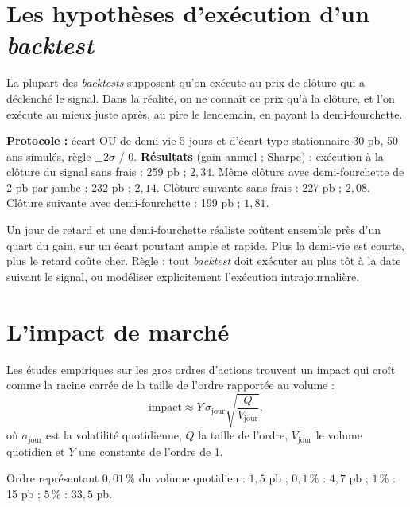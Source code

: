 \section{Les hypothèses d'exécution d'un \emph{backtest}}

La plupart des \emph{backtests} supposent qu'on exécute au prix de clôture qui a déclenché le signal. Dans la réalité, on ne connaît ce prix qu'à la clôture, et l'on exécute au mieux juste après, au pire le lendemain, en payant la demi-fourchette.

\begin{codebox}
\textbf{Protocole :} écart OU de demi-vie 5 jours et d'écart-type stationnaire 30 pb, 50 ans simulés, règle $\pm2\sigma$ / 0. \textbf{Résultats} (gain annuel ; Sharpe) : exécution à la clôture du signal sans frais : 259 pb ; $2{,}34$. Même clôture avec demi-fourchette de 2 pb par jambe : 232 pb ; $2{,}14$. Clôture suivante sans frais : 227 pb ; $2{,}08$. Clôture suivante avec demi-fourchette : 199 pb ; $1{,}81$.
\end{codebox}

Un jour de retard et une demi-fourchette réaliste coûtent ensemble près d'un quart du gain, sur un écart pourtant ample et rapide. Plus la demi-vie est courte, plus le retard coûte cher. Règle : tout \emph{backtest} doit exécuter au plus tôt à la date suivant le signal, ou modéliser explicitement l'exécution intrajournalière.

\section{L'impact de marché}

Les études empiriques sur les gros ordres d'actions trouvent un impact qui croît comme la racine carrée de la taille de l'ordre rapportée au volume :
\[
\text{impact} \approx Y\,\sigma_{\text{jour}}\sqrt{\frac{Q}{V_{\text{jour}}}},
\]
où $\sigma_{\text{jour}}$ est la volatilité quotidienne, $Q$ la taille de l'ordre, $V_{\text{jour}}$ le volume quotidien et $Y$ une constante de l'ordre de 1.

\begin{codebox}[ — E4, ordres de grandeur ($\sigma_{\text{jour}} = 1{,}5\,\%$, $Y = 1$)]
Ordre représentant $0{,}01\,\%$ du volume quotidien : $1{,}5$ pb ; $0{,}1\,\%$ : $4{,}7$ pb ; $1\,\%$ : 15 pb ; $5\,\%$ : $33{,}5$ pb.
\end{codebox}

